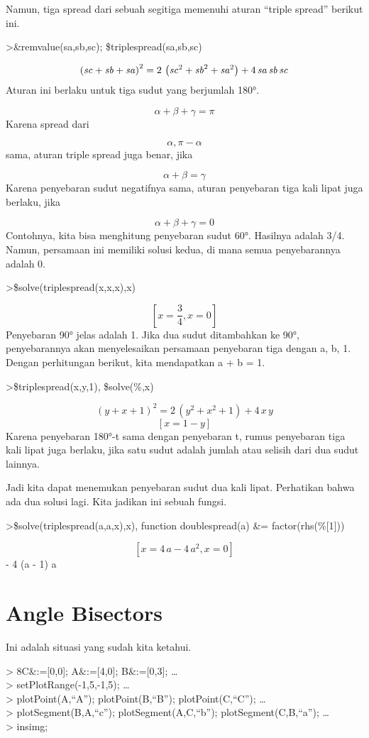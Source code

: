 \documentclass[
]{book}
\begin{document}
Namun, tiga spread dari sebuah segitiga memenuhi aturan ``triple spread'' berikut ini.

\textgreater\&remvalue(sa,sb,sc); \$triplespread(sa,sb,sc)

\[\left({\it sc}+{\it sb}+{\it sa}\right)^2=2\,\left({\it sc}^2+
 {\it sb}^2+{\it sa}^2\right)+4\,{\it sa}\,{\it sb}\,{\it sc}\]Aturan ini berlaku untuk tiga sudut yang berjumlah 180°.

\[\alpha+\beta+\gamma=\pi\]Karena spread dari

\[\alpha, \pi-\alpha\]sama, aturan triple spread juga benar, jika

\[\alpha+\beta=\gamma\]Karena penyebaran sudut negatifnya sama, aturan penyebaran tiga kali lipat juga berlaku, jika

\[\alpha+\beta+\gamma=0\]Contohnya, kita bisa menghitung penyebaran sudut 60°. Hasilnya adalah 3/4. Namun, persamaan ini memiliki solusi kedua, di mana semua penyebarannya adalah 0.

\textgreater\$solve(triplespread(x,x,x),x)

\[\left[ x=\frac{3}{4} , x=0 \right] \]Penyebaran 90° jelas adalah 1. Jika dua sudut ditambahkan ke 90°, penyebarannya akan menyelesaikan persamaan penyebaran tiga dengan a, b, 1. Dengan perhitungan berikut, kita mendapatkan a + b = 1.

\textgreater\$triplespread(x,y,1), \$solve(\%,x)

\[\left(y+x+1\right)^2=2\,\left(y^2+x^2+1\right)+4\,x\,y\]\[\left[ x=1-y \right] \]Karena penyebaran 180°-t sama dengan penyebaran t, rumus penyebaran tiga kali lipat juga berlaku, jika satu sudut adalah jumlah atau selisih dari dua sudut lainnya.

Jadi kita dapat menemukan penyebaran sudut dua kali lipat. Perhatikan bahwa ada dua solusi lagi. Kita jadikan ini sebuah fungsi.

\textgreater\$solve(triplespread(a,a,x),x), function doublespread(a) \&= factor(rhs(\%{[}1{]}))

\[\left[ x=4\,a-4\,a^2 , x=0 \right] \] - 4 (a - 1) a

\section{Angle Bisectors}\label{angle-bisectors}

Ini adalah situasi yang sudah kita ketahui.

\textgreater{} 8C\&:={[}0,0{]}; A\&:={[}4,0{]}; B\&:={[}0,3{]}; \ldots{}\\
\textgreater{} setPlotRange(-1,5,-1,5); \ldots{}\\
\textgreater{} plotPoint(A,``A''); plotPoint(B,``B''); plotPoint(C,``C''); \ldots{}\\
\textgreater{} plotSegment(B,A,``c''); plotSegment(A,C,``b''); plotSegment(C,B,``a''); \ldots{}\\
\textgreater{} insimg;
\end{document}
